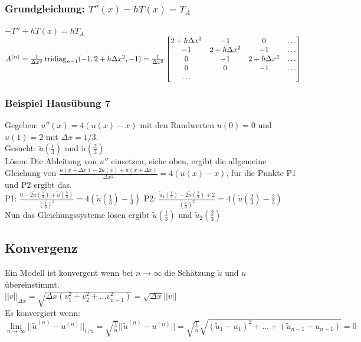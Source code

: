 \subsubsection{Grundgleichung: $T''(x) -  h T(x) = T_A$}
$-T'' + h T(x) = h T_A$\\
$A^{(n)}= \frac{1}{\Delta x^2} \operatorname{tridiag}_{n-1}
(-1,2+h\Delta x^2,-1) = \frac{1}{\Delta x^2}
  \begin{bmatrix}
             2+h\Delta x^2& -1 & 0 & \ldots \\
             -1& 2+h\Delta x^2 & -1 & \ldots \\
              0& -1 & 2+h\Delta x^2 & \ldots \\
              0& 0 & -1 & \ldots \\
             \ldots 
           \end{bmatrix} $\\    
              
\subsubsection{Beispiel Hausübung 7}
Gegeben: $ u''(x)=4(u(x)-x) $ mit den Randwerten $ u(0)=0 $  und $ u(1)=2 $ mit $\Delta x=1/3$.
\\
Gesucht: $ \tilde{u}(\frac{1}{3}) $ und $ \tilde{u}(\frac{2}{3}) $
\\
Lösen: Die Ableitung von $ u'' $ einsetzen, siehe oben, ergibt die allgemeine Gleichung von $ \frac{u(x-\Delta x)-2 u(x) + u(x+ \Delta x)}{\Delta x^2} =4 (u(x)-x) $, für die Punkte P1 und P2 ergibt das.
\\
P1: $ \frac{0-2 \tilde{u}(\frac{1}{3}) + \tilde{u}(\frac{2}{3})}{(\frac{1}{3})^2} =4(\tilde{u}(\frac{1}{3})-\frac{1}{3}) $
\qquad \qquad
P2: $ \frac{\tilde{u}_1(\frac{1}{3})-2 \tilde{u}(\frac{2}{3}) + 2}{(\frac{1}{3})^2} =4(\tilde{u}(\frac{2}{3})-\frac{2}{3}) $
\\
Nun das Gleichungssysteme lösen ergibt $ \tilde{u}(\frac{1}{3}) $ und $ \tilde{u}_2(\frac{2}{3}) $          
           
           
\subsection{Konvergenz}
Ein Modell ist konvergent wenn bei $n\rightarrow\infty$ die Schätzung $\tilde{u}$ und $u$ übereinstimmt.\\

$\boxed{||v||_{\Delta x}=\sqrt{\Delta x (v_1^2+v_2^2 + \ldots v_{n-1}^2)}= \sqrt{\Delta
x}||v||}$\\
Es konvergiert wenn: $\lim\limits_{n\to \infty
}||\tilde{u}^{(n)}-u^{(n)}||_{1/n}=\sqrt{\frac{1}{n}}||\tilde{u}^{(n)}-u^{(n)}||=\sqrt{\frac{1}{n}}\sqrt{(\tilde{u}_1-u_1)^2
+ \ldots + (\tilde{u}_{n-1}-u_{n-1})}=0$\\

